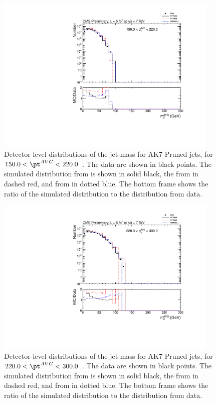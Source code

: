 \begin{figure}[htbp]
\centering
\includegraphics[width=0.95\textwidth]{figs/histAK7MjetVsPtAvg_rawDataMCComparisons_pt_3_Pruned}
\caption{Detector-level distributions of the jet mass for AK7 Pruned jets,
for $150.0 < \pt^{AVG} < 220.0$ \GeVc. The data are shown in black points.
The simulated distribution from \PYTHIA is shown in solid black, 
the from \PYTHIAEIGHT in dashed red, and from \HERWIG in dotted blue. 
The bottom frame shows the ratio of the simulated distribution
to the distribution from data. 
\label{figs:histAK7MjetVsPtAvg_rawDataMCComparisons_pt_3_Pruned}}
\end{figure}



\begin{figure}[htbp]
\centering
\includegraphics[width=0.95\textwidth]{figs/histAK7MjetVsPtAvg_rawDataMCComparisons_pt_4_Pruned}
\caption{Detector-level distributions of the jet mass for AK7 Pruned jets,
for $220.0 < \pt^{AVG} < 300.0$ \GeVc. The data are shown in black points.
The simulated distribution from \PYTHIA is shown in solid black, 
the from \PYTHIAEIGHT in dashed red, and from \HERWIG in dotted blue. 
The bottom frame shows the ratio of the simulated distribution
to the distribution from data. 
\label{figs:histAK7MjetVsPtAvg_rawDataMCComparisons_pt_4_Pruned}}
\end{figure}



